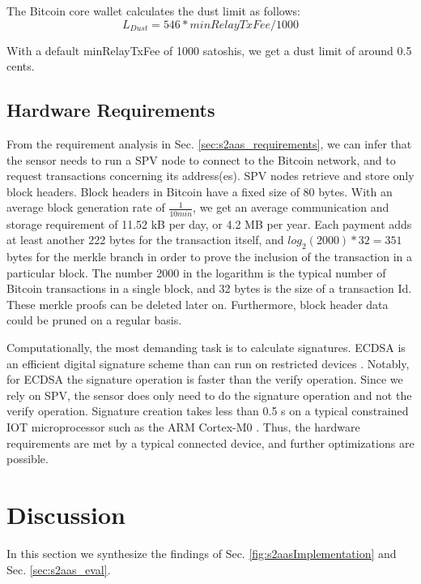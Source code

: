 The Bitcoin core wallet calculates the dust limit as follows:
\begin{equation*}
L_{Dust} = 546*minRelayTxFee/1000
\end{equation*}

With a default minRelayTxFee of 1000 satoshis, we get a dust limit of around 0.5 cents.

\subsection{Hardware Requirements}

From the requirement analysis in Sec. \ref{sec:s2aas_requirements}, we can infer that the sensor needs to run a \ac{SPV} node to connect to the Bitcoin network, and to request transactions concerning its address(es). \ac{SPV} nodes retrieve and store only block headers. Block headers in Bitcoin have a fixed size of 80 bytes. With an average block generation rate of $\frac{1}{10 min}$, we get an average communication and storage requirement of 11.52 kB per day, or 4.2 MB per year. Each payment adds at least another 222 bytes for the transaction itself, and $log_2(2000)*32=351$ bytes for the merkle branch in order to prove the inclusion of the transaction in a particular block. The number 2000 in the logarithm is the typical number of Bitcoin transactions in a single block, and 32 bytes is the size of a transaction Id. These merkle proofs can be deleted later on. Furthermore, block header data could be pruned on a regular basis.

Computationally, the most demanding task is to calculate signatures. \ac{ECDSA} is an efficient digital signature scheme than can run on restricted devices \parencite{fi3010031}. Notably, for \ac{ECDSA} the signature operation is faster than the verify operation. Since we rely on \ac{SPV}, the sensor does only need to do the signature operation and not the verify operation. Signature creation takes less than 0.5 s on a typical constrained \ac{IOT} microprocessor such as the ARM Cortex-M0 \parencite{ecdsaarm}. Thus, the hardware requirements are met by a typical connected device, and further optimizations are possible.

\section{Discussion}
\label{sec:s2aas_findings}

In this section we synthesize the findings of Sec. \ref{fig:s2aasImplementation} and Sec. \ref{sec:s2aas_eval}.

